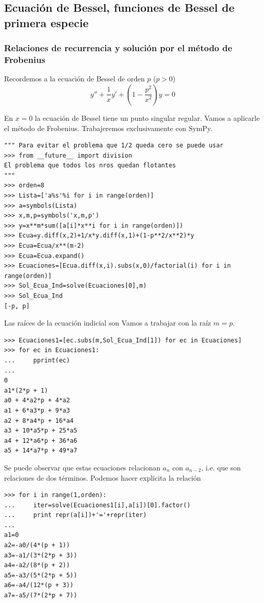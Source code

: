 \documentclass{article}
\begin{document}
\subsection{Ecuación de Bessel, funciones de Bessel de primera especie}\label{sec:bessel_1}

\subsubsection{Relaciones de recurrencia y solución por el método de Frobenius}

\begin{definicion} Recordemos a la ecuación de Bessel de orden $p$ ($p>0$)
 \[y''+\frac{1}{x}y'+\left(1-\frac{p^2}{x^2}\right)y=0\]
\end{definicion}

En $x=0$ la ecuación de Bessel tiene un punto  singular regular. Vamos a aplicarle el método de Frobenius. Trabajeremos exclusivamente con SymPy.






\begin{lstlisting}
""" Para evitar el problema que 1/2 queda cero se puede usar
>>> from __future__ import division
El problema que todos los nros quedan flotantes
"""
>>> orden=8
>>> Lista=['a%s'%i for i in range(orden)]
>>> a=symbols(Lista)
>>> x,m,p=symbols('x,m,p')
>>> y=x**m*sum([a[i]*x**i for i in range(orden)])
>>> Ecua=y.diff(x,2)+1/x*y.diff(x,1)+(1-p**2/x**2)*y
>>> Ecua=Ecua/x**(m-2)
>>> Ecua=Ecua.expand()
>>> Ecuaciones=[Ecua.diff(x,i).subs(x,0)/factorial(i) for i in range(orden)]
>>> Sol_Ecua_Ind=solve(Ecuaciones[0],m)
>>> Sol_Ecua_Ind
[-p, p]
\end{lstlisting}
Las raíces de la ecuación indicial son
Vamos a trabajar con la raíz $m=p$. 

\begin{lstlisting}
>>> Ecuaciones1=[ec.subs(m,Sol_Ecua_Ind[1]) for ec in Ecuaciones]
>>> for ec in Ecuaciones1:
...     pprint(ec)
... 
0
a1*(2*p + 1)
a0 + 4*a2*p + 4*a2
a1 + 6*a3*p + 9*a3
a2 + 8*a4*p + 16*a4
a3 + 10*a5*p + 25*a5
a4 + 12*a6*p + 36*a6
a5 + 14*a7*p + 49*a7
\end{lstlisting}
Se puede observar que estas ecuaciones relacionan  $a_n$ con $a_{n-2}$, i.e. que son relaciones de dos términos.  Podemos hacer explícita la relación

\begin{lstlisting}
>>> for i in range(1,orden):
...     iter=solve(Ecuaciones1[i],a[i])[0].factor()
...     print repr(a[i])+'='+repr(iter)
... 
a1=0
a2=-a0/(4*(p + 1))
a3=-a1/(3*(2*p + 3))
a4=-a2/(8*(p + 2))
a5=-a3/(5*(2*p + 5))
a6=-a4/(12*(p + 3))
a7=-a5/(7*(2*p + 7))
\end{lstlisting}
\end{document}
